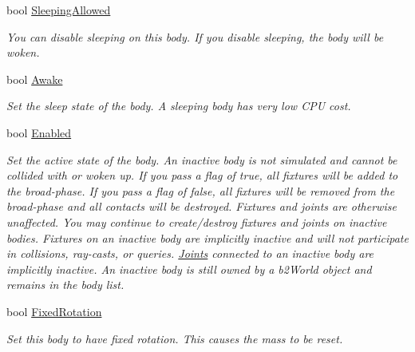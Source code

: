 \begin{DoxyCompactItemize}
bool \hyperlink{class_farseer_physics_1_1_dynamics_1_1_body_a6c751c76463ec02d5af4223be31dde79}{Sleeping\+Allowed}
\begin{DoxyCompactList}\small\item\em You can disable sleeping on this body. If you disable sleeping, the body will be woken. \end{DoxyCompactList}\item 
bool \hyperlink{class_farseer_physics_1_1_dynamics_1_1_body_a6641e547d28ab0560ecc8c37affc2b72}{Awake}
\begin{DoxyCompactList}\small\item\em Set the sleep state of the body. A sleeping body has very low C\+P\+U cost. \end{DoxyCompactList}\item 
bool \hyperlink{class_farseer_physics_1_1_dynamics_1_1_body_a4e0a0f5f740db974471702e881371909}{Enabled}
\begin{DoxyCompactList}\small\item\em Set the active state of the body. An inactive body is not simulated and cannot be collided with or woken up. If you pass a flag of true, all fixtures will be added to the broad-\/phase. If you pass a flag of false, all fixtures will be removed from the broad-\/phase and all contacts will be destroyed. Fixtures and joints are otherwise unaffected. You may continue to create/destroy fixtures and joints on inactive bodies. Fixtures on an inactive body are implicitly inactive and will not participate in collisions, ray-\/casts, or queries. \hyperlink{namespace_farseer_physics_1_1_dynamics_1_1_joints}{Joints} connected to an inactive body are implicitly inactive. An inactive body is still owned by a b2\+World object and remains in the body list. \end{DoxyCompactList}\item 
bool \hyperlink{class_farseer_physics_1_1_dynamics_1_1_body_ad4f25a8227521e9c48643baaa1744dd4}{Fixed\+Rotation}
\begin{DoxyCompactList}\small\item\em Set this body to have fixed rotation. This causes the mass to be reset. \end{DoxyCompactList}\item 

\end{DoxyCompactItemize}
